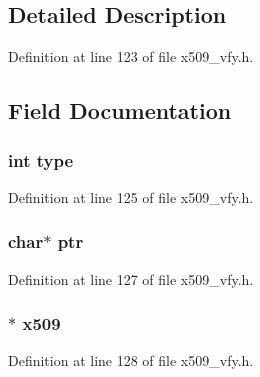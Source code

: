 \subsection{Detailed Description}


Definition at line 123 of file x509\+\_\+vfy.\+h.



\subsection{Field Documentation}
\subsubsection[{\texorpdfstring{type}{type}}]{\setlength{\rightskip}{0pt plus 5cm}int type}\hypertarget{structx509__object__st_ac765329451135abec74c45e1897abf26}{}\label{structx509__object__st_ac765329451135abec74c45e1897abf26}


Definition at line 125 of file x509\+\_\+vfy.\+h.

\subsubsection[{\texorpdfstring{ptr}{ptr}}]{\setlength{\rightskip}{0pt plus 5cm}char$\ast$ ptr}\hypertarget{structx509__object__st_a935adc2e417a61d7eb6f04efb18ba031}{}\label{structx509__object__st_a935adc2e417a61d7eb6f04efb18ba031}


Definition at line 127 of file x509\+\_\+vfy.\+h.

\subsubsection[{\texorpdfstring{x509}{x509}}]{$\ast$ x509}\hypertarget{structx509__object__st_ae8dd37c61140e5f8d161c160481b53d5}{}\label{structx509__object__st_ae8dd37c61140e5f8d161c160481b53d5}


Definition at line 128 of file x509\+\_\+vfy.\+h.

